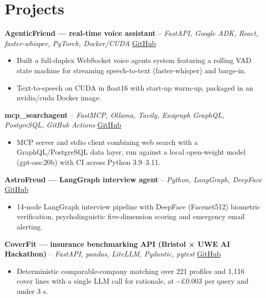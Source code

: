 \documentclass[a4paper,11pt]{article}
\begin{document}
\section{Projects}
\noindent\textbf{AgenticFriend — real-time voice assistant} -- \textit{FastAPI, Google ADK, React, faster-whisper, PyTorch, Docker/CUDA} \hfill \href{https://github.com/Thiruvel-AP/adk_multi-agent}{GitHub}
\begin{itemize}
  \item Built a full-duplex WebSocket voice agents system featuring a rolling VAD state machine for streaming speech-to-text (faster-whisper) and barge-in.
  \item Text-to-speech on CUDA in float16 with start-up warm-up, packaged in an nvidia/cuda Docker image.
\end{itemize}
\vspace{3pt}
\noindent\textbf{mcp\_searchagent} -- \textit{FastMCP, Ollama, Tavily, Exograph GraphQL, PostgreSQL, GitHub Actions} \hfill \href{https://github.com/Thiruvel-AP/mcp_searchagent}{GitHub}
\begin{itemize}
  \item MCP server and stdio client combining web search with a GraphQL/PostgreSQL data layer, run against a local open-weight model (gpt-oss:20b) with CI across Python 3.9–3.11.
\end{itemize}
\vspace{3pt}
\noindent\textbf{AstroFreud — LangGraph interview agent} -- \textit{Python, LangGraph, DeepFace} \hfill \href{https://github.com/Thiruvel-AP/AstroFreud}{GitHub}
\begin{itemize}
  \item 14-node LangGraph interview pipeline with DeepFace (Facenet512) biometric verification, psycholinguistic five-dimension scoring and emergency email alerting.
\end{itemize}
\vspace{3pt}
\noindent\textbf{CoverFit — insurance benchmarking API (Bristol × UWE AI Hackathon)} -- \textit{FastAPI, pandas, LiteLLM, Pydantic, pytest} \hfill \href{https://github.com/Thiruvel-AP/AIHackathon-Phoenix}{GitHub}
\begin{itemize}
  \item Deterministic comparable-company matching over 221 profiles and 1,116 cover lines with a single LLM call for rationale, at \textasciitilde{}£0.003 per query and under 3 s.
\end{itemize}
\end{document}
